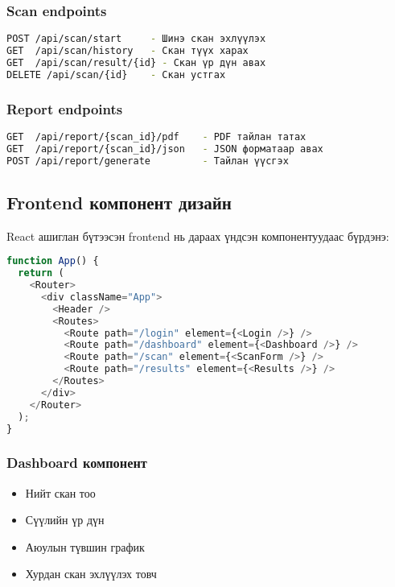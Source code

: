 \documentclass[main.tex]{subfiles}
\begin{document}
\subsubsection{Scan endpoints}
\begin{lstlisting}[language=bash, caption=Сканны API]
POST /api/scan/start     - Шинэ скан эхлүүлэх
GET  /api/scan/history   - Скан түүх харах
GET  /api/scan/result/{id} - Скан үр дүн авах
DELETE /api/scan/{id}    - Скан устгах
\end{lstlisting}

\subsubsection{Report endpoints}
\begin{lstlisting}[language=bash, caption=Тайлангийн API]
GET  /api/report/{scan_id}/pdf    - PDF тайлан татах
GET  /api/report/{scan_id}/json   - JSON форматаар авах
POST /api/report/generate         - Тайлан үүсгэх
\end{lstlisting}

\subsection{Frontend компонент дизайн}

React ашиглан бүтээсэн frontend нь дараах үндсэн компонентуудаас бүрдэнэ:

\begin{lstlisting}[language=JavaScript, caption=App.js - Үндсэн компонент]
function App() {
  return (
    <Router>
      <div className="App">
        <Header />
        <Routes>
          <Route path="/login" element={<Login />} />
          <Route path="/dashboard" element={<Dashboard />} />
          <Route path="/scan" element={<ScanForm />} />
          <Route path="/results" element={<Results />} />
        </Routes>
      </div>
    </Router>
  );
}
\end{lstlisting}

\subsubsection{Dashboard компонент}
\begin{itemize}
    \item Нийт скан тоо
    \item Сүүлийн үр дүн
    \item Аюулын түвшин график
    \item Хурдан скан эхлүүлэх товч
\end{itemize}
\end{document}
